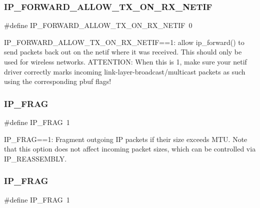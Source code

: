 \subsubsection{\texorpdfstring{I\+P\+\_\+\+F\+O\+R\+W\+A\+R\+D\+\_\+\+A\+L\+L\+O\+W\+\_\+\+T\+X\+\_\+\+O\+N\+\_\+\+R\+X\+\_\+\+N\+E\+T\+IF}{IP\_FORWARD\_ALLOW\_TX\_ON\_RX\_NETIF}\hspace{0.1cm}{\footnotesize\ttfamily [2/2]}}
{\footnotesize\ttfamily \#define I\+P\+\_\+\+F\+O\+R\+W\+A\+R\+D\+\_\+\+A\+L\+L\+O\+W\+\_\+\+T\+X\+\_\+\+O\+N\+\_\+\+R\+X\+\_\+\+N\+E\+T\+IF~0}

I\+P\+\_\+\+F\+O\+R\+W\+A\+R\+D\+\_\+\+A\+L\+L\+O\+W\+\_\+\+T\+X\+\_\+\+O\+N\+\_\+\+R\+X\+\_\+\+N\+E\+T\+IF==1\+: allow ip\+\_\+forward() to send packets back out on the netif where it was received. This should only be used for wireless networks. A\+T\+T\+E\+N\+T\+I\+ON\+: When this is 1, make sure your netif driver correctly marks incoming link-\/layer-\/broadcast/multicast packets as such using the corresponding pbuf flags! \mbox{\label{group__lwip__opts__ipv4_gaf85c8bdd5035b6cada790b4cc2a209a4}} 
\subsubsection{\texorpdfstring{I\+P\+\_\+\+F\+R\+AG}{IP\_FRAG}\hspace{0.1cm}{\footnotesize\ttfamily [1/2]}}
{\footnotesize\ttfamily \#define I\+P\+\_\+\+F\+R\+AG~1}

I\+P\+\_\+\+F\+R\+AG==1\+: Fragment outgoing IP packets if their size exceeds M\+TU. Note that this option does not affect incoming packet sizes, which can be controlled via I\+P\+\_\+\+R\+E\+A\+S\+S\+E\+M\+B\+LY. \mbox{\label{group__lwip__opts__ipv4_gaf85c8bdd5035b6cada790b4cc2a209a4}} 
\subsubsection{\texorpdfstring{I\+P\+\_\+\+F\+R\+AG}{IP\_FRAG}\hspace{0.1cm}{\footnotesize\ttfamily [2/2]}}
{\footnotesize\ttfamily \#define I\+P\+\_\+\+F\+R\+AG~1}

